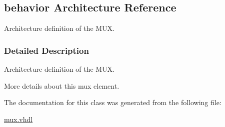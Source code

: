 \hypertarget{classmux__using__with_1_1behavior}{}\subsection{behavior Architecture Reference}
\label{classmux__using__with_1_1behavior}


Architecture definition of the M\+UX.  




\subsubsection{Detailed Description}
Architecture definition of the M\+UX. 

More details about this mux element. 

The documentation for this class was generated from the following file\+:\begin{DoxyCompactItemize}
\item 
\hyperlink{mux_8vhdl}{mux.\+vhdl}\end{DoxyCompactItemize}

